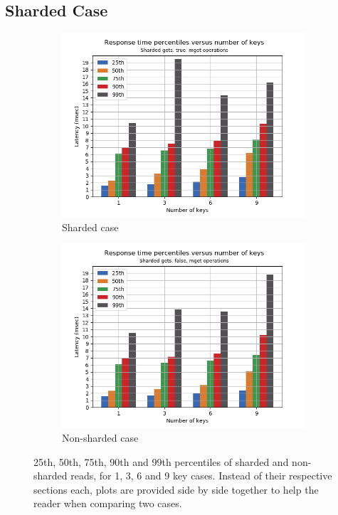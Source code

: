 \documentclass[11pt,a4paper]{article}
\begin{document}
\subsection{Sharded Case} \label{sec:gmg-true}
\begin{figure}[h]
\begin{subfigure}{.5\textwidth}
  \centering
  \includegraphics[width=1.0\linewidth ,trim={0 0 0 0},clip]{img/plot/gmg-perc-true.png}
  \caption{Sharded case}
  \label{fig:gmg-perc-true}
\end{subfigure}%
\begin{subfigure}{.5\textwidth}
  \centering
  \includegraphics[width=1.0\linewidth ,trim={0 0 0 0},clip]{img/plot/gmg-perc-false.png}
  \caption{Non-sharded case}
  \label{fig:gmg-perc-false}
\end{subfigure}
\caption{25th, 50th, 75th, 90th and 99th percentiles of sharded and non-sharded reads, for 1, 3, 6 and 9 key cases. Instead of their respective sections each, plots are provided side by side together to help the reader when comparing two cases.}
\label{fig:gmg-perc}
\end{figure}
\end{document}
